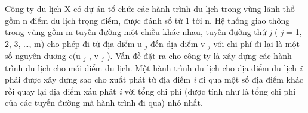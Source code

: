 Công ty du lịch X có dự án tổ chức các hành trình du lịch trong vùng lãnh thổ gồm n điểm du lịch trọng điểm, được đánh số từ 1 tới n. Hệ thống giao thông trong vùng gồm m tuyến đường một chiều khác nhau, tuyến đường thứ \emph{ j } ( \emph{ j } = 1, 2, 3, …, m) cho phép đi từ địa diểm u $_ j $ đến dịa diểm v $_ j $ với chi phí đi lại là một số nguyên dương c(u $_ j $ , v $_ j $ ). Vấn đề đặt ra cho công ty là xây dựng các hành trình du lịch cho mỗi điểm du lịch. Một hành trình du lịch cho địa điểm du lịch \emph{ i } phải được xây dựng sao cho xuất phát từ địa điểm \emph{ i } đi qua một số địa điểm khác rồi quay lại địa điểm xấu phát \emph{ i } với tổng chi phí (được tính như là tổng chi phí của các tuyến đường mà hành trình đi qua) nhỏ nhất.

\